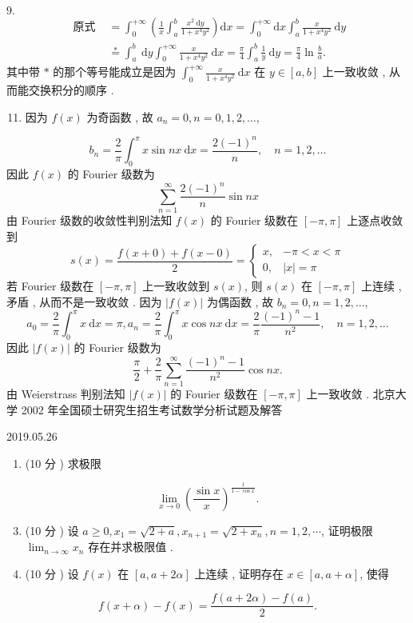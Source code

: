 \documentclass[10pt]{article}
\begin{document}
$9 .$
$$
\begin{aligned}
\text { 原式 } &=\int_{0}^{+\infty}\left(\frac{1}{x} \int_{a}^{b} \frac{x^{2} \mathrm{~d} y}{1+x^{4} y^{2}}\right) \mathrm{d} x=\int_{0}^{+\infty} \mathrm{d} x \int_{a}^{b} \frac{x}{1+x^{4} y^{2}} \mathrm{~d} y \\
& \stackrel{*}{=} \int_{a}^{b} \mathrm{~d} y \int_{0}^{+\infty} \frac{x}{1+x^{4} y^{2}} \mathrm{~d} x=\frac{\pi}{4} \int_{a}^{b} \frac{1}{y} \mathrm{~d} y=\frac{\pi}{4} \ln \frac{b}{a} .
\end{aligned}
$$
 其中带  $*$  的那个等号能成立是因为  $\int_{0}^{+\infty} \frac{x}{1+x^{4} y^{2}} \mathrm{~d} x$  在  $y \in[a, b]$  上一致收敛 ,  从而能交换积分的顺序 .

\begin{enumerate}
  \setcounter{enumi}{10}
  \item  因为  $f(x)$  为奇函数 ,  故  $a_{n}=0, n=0,1,2, \ldots$,
\end{enumerate}
$$
b_{n}=\frac{2}{\pi} \int_{0}^{\pi} x \sin n x \mathrm{~d} x=\frac{2(-1)^{n}}{n}, \quad n=1,2, \ldots
$$
 因此  $f(x)$  的  Fourier  级数为 
$$
\sum_{n=1}^{\infty} \frac{2(-1)^{n}}{n} \sin n x
$$
 由  Fourier  级数的收敛性判别法知  $f(x)$  的  Fourier  级数在  $[-\pi, \pi]$  上逐点收敛到 
$$
s(x)=\frac{f(x+0)+f(x-0)}{2}= \begin{cases}x, & -\pi<x<\pi \\ 0, & |x|=\pi\end{cases}
$$
 若  Fourier  级数在  $[-\pi, \pi]$  上一致收敛到  $s(x)$,  则  $s(x)$  在  $[-\pi, \pi]$  上连续 ,  矛盾 ,  从而不是一致收敛 .  因为  $|f(x)|$  为偶函数 ,  故  $b_{n}=0, n=1,2, \ldots$,
$$
a_{0}=\frac{2}{\pi} \int_{0}^{\pi} x \mathrm{~d} x=\pi, a_{n}=\frac{2}{\pi} \int_{0}^{\pi} x \cos n x \mathrm{~d} x=\frac{2}{\pi} \frac{(-1)^{n}-1}{n^{2}}, \quad n=1,2, \ldots
$$
 因此  $|f(x)|$  的  Fourier  级数为 
$$
\frac{\pi}{2}+\frac{2}{\pi} \sum_{n=1}^{\infty} \frac{(-1)^{n}-1}{n^{2}} \cos n x .
$$
 由  Weierstrass  判别法知  $|f(x)|$  的  Fourier  级数在  $[-\pi, \pi]$  上一致收敛 .  北京大学  2002  年全国硕士研究生招生考试数学分析试题及解答 

   

2019.05.26

\begin{enumerate}
  \item (10  分 )  求极限 
\end{enumerate}
$$
\lim _{x \rightarrow 0}\left(\frac{\sin x}{x}\right)^{\frac{1}{1-\cos x}} .
$$

\begin{enumerate}
  \setcounter{enumi}{2}
  \item (10  分 )  设  $a \geqslant 0, x_{1}=\sqrt{2+a}, x_{n+1}=\sqrt{2+x_{n}}, n=1,2, \cdots$,  证明极限  $\lim _{n \rightarrow \infty} x_{n}$  存在并求极限值 .

  \item (10  分 )  设  $f(x)$  在  $[a, a+2 \alpha]$  上连续 ,  证明存在  $x \in[a, a+\alpha]$,  使得 

\end{enumerate}
$$
f(x+\alpha)-f(x)=\frac{f(a+2 \alpha)-f(a)}{2} .
$$
\end{document}
